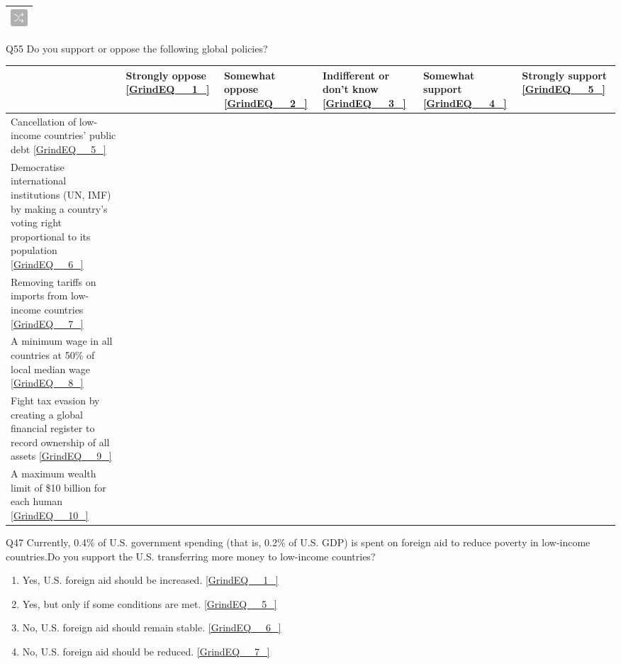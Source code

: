 \documentclass{article} %
\begin{document}
\noindent 

\noindent 

\begin{tabular}{|p{0.2in}|} \hline 
\includegraphics*[width=0.25in, height=0.25in]{image12} \\ \hline 
\end{tabular}



\noindent Q55 Do you support or oppose the following global policies?

\begin{tabular}{|p{0.7in}|p{0.7in}|p{0.7in}|p{0.7in}|p{0.7in}|p{0.7in}|} \hline 
 & Strongly oppose \eqref{GrindEQ__1_} & Somewhat oppose \eqref{GrindEQ__2_} & Indifferent or don't know \eqref{GrindEQ__3_} & Somewhat support \eqref{GrindEQ__4_} & Strongly support \eqref{GrindEQ__5_} \\ \hline 
Cancellation of low-income countries' public debt \eqref{GrindEQ__5_}  &   &   &   &   &   \\ \hline 
Democratise international institutions (UN, IMF) by making a country's voting right proportional to its population \eqref{GrindEQ__6_}  &   &   &   &   &   \\ \hline 
Removing tariffs on imports from low-income countries \eqref{GrindEQ__7_}  &   &   &   &   &   \\ \hline 
A minimum wage in all countries at 50\% of local median wage \eqref{GrindEQ__8_}  &   &   &   &   &   \\ \hline 
Fight tax evasion by creating a global financial register to record ownership of all assets \eqref{GrindEQ__9_}  &   &   &   &   &   \\ \hline 
A maximum wealth limit of \$10 billion for each human \eqref{GrindEQ__10_}  &   &   &   &   &   \\ \hline 
\end{tabular}



\noindent 

\noindent 

\noindent 

\noindent Q47 Currently, 0.4\% of U.S. government spending (that is, 0.2\% of U.S. GDP) is spent on foreign aid to reduce poverty in low-income countries.Do you support the U.S. transferring more money to low-income countries?

\begin{enumerate}
\item  Yes, U.S. foreign aid should be increased.  \eqref{GrindEQ__1_} 

\item  Yes, but only if some conditions are met.  \eqref{GrindEQ__5_} 

\item  No, U.S. foreign aid should remain stable.  \eqref{GrindEQ__6_} 

\item  No, U.S. foreign aid should be reduced.  \eqref{GrindEQ__7_} 
\end{enumerate}
\end{document}
